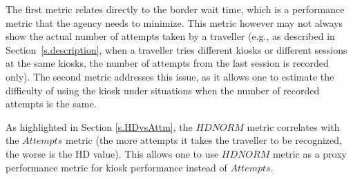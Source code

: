 \documentclass{cta-author}%
\newcommand{\cmt}[1]{}
\begin{document}
\cmt{
To conduct the analysis, the following two metrics were computed using data from all travellers, knowing that some of them used the system only once and some used it more than a hundred times, with 942 passages being the largest number of passages for a subject.

\begin{itemize}
\item      Metric 1: The proportion of travellers  who more likely than not are rejected by the system, i.e., for whom the average number of $Attempts$ %
is higher than 1.5. 
\item       Metric 2: The proportion of travellers  who have minimum matching score $HDNORM$ higher than 0.2.  
\end{itemize}


}

The first metric relates directly to the border wait time, which
is a  performance metric that the agency needs to minimize. 
This metric however may not  always show the actual number of attempts taken by a traveller (e.g., as described in Section~\ref{s.description}, when a traveller 
tries different kiosks or different sessions at the same kiosks, the number of attempts from the last session is recorded only). 
The second metric addresses this issue, as it allows one to estimate the difficulty of using the kiosk  under situations when the number of recorded attempts is the same.  


As highlighted in Section \ref{s.HDvsAttm}, the $HDNORM$ metric correlates with the $Attempts$ metric (the more attempts it takes the traveller to be recognized, the worse is the HD value). This allows one to use
$HDNORM$ metric as a proxy performance metric for kiosk performance instead of $Attempts$.

\end{document}
